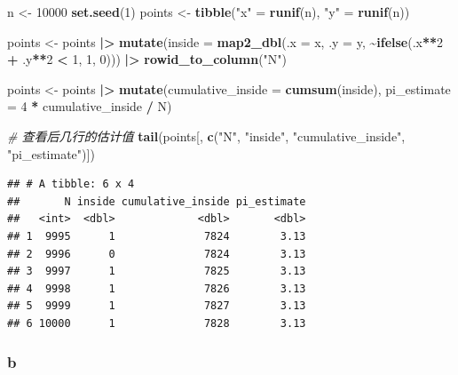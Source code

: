 \documentclass[
]{article}
\newenvironment{Shaded}{\begin{snugshade}}{\end{snugshade}}
\newcommand{\AttributeTok}[1]{\textcolor[rgb]{0.13,0.29,0.53}{#1}}
\newcommand{\CommentTok}[1]{\textcolor[rgb]{0.56,0.35,0.01}{\textit{#1}}}
\newcommand{\DecValTok}[1]{\textcolor[rgb]{0.00,0.00,0.81}{#1}}
\newcommand{\FunctionTok}[1]{\textcolor[rgb]{0.13,0.29,0.53}{\textbf{#1}}}
\newcommand{\NormalTok}[1]{#1}
\newcommand{\OtherTok}[1]{\textcolor[rgb]{0.56,0.35,0.01}{#1}}
\newcommand{\SpecialCharTok}[1]{\textcolor[rgb]{0.81,0.36,0.00}{\textbf{#1}}}
\newcommand{\StringTok}[1]{\textcolor[rgb]{0.31,0.60,0.02}{#1}}
\begin{document}
\begin{Shaded}
\begin{Highlighting}[]
\NormalTok{n }\OtherTok{\textless{}{-}} \DecValTok{10000}
\FunctionTok{set.seed}\NormalTok{(}\DecValTok{1}\NormalTok{)}
\NormalTok{points }\OtherTok{\textless{}{-}} \FunctionTok{tibble}\NormalTok{(}\StringTok{"x"} \OtherTok{=} \FunctionTok{runif}\NormalTok{(n), }\StringTok{"y"} \OtherTok{=} \FunctionTok{runif}\NormalTok{(n))}

\NormalTok{points }\OtherTok{\textless{}{-}}\NormalTok{ points }\SpecialCharTok{|\textgreater{}}
\FunctionTok{mutate}\NormalTok{(}\AttributeTok{inside =} \FunctionTok{map2\_dbl}\NormalTok{(}\AttributeTok{.x =}\NormalTok{ x, }\AttributeTok{.y =}\NormalTok{ y, }\SpecialCharTok{\textasciitilde{}}\FunctionTok{ifelse}\NormalTok{(.x}\SpecialCharTok{**}\DecValTok{2} \SpecialCharTok{+}\NormalTok{ .y}\SpecialCharTok{**}\DecValTok{2} \SpecialCharTok{\textless{}} \DecValTok{1}\NormalTok{, }\DecValTok{1}\NormalTok{, }\DecValTok{0}\NormalTok{))) }\SpecialCharTok{|\textgreater{}}
\FunctionTok{rowid\_to\_column}\NormalTok{(}\StringTok{"N"}\NormalTok{)}


\NormalTok{points }\OtherTok{\textless{}{-}}\NormalTok{ points }\SpecialCharTok{|\textgreater{}}
  \FunctionTok{mutate}\NormalTok{(}\AttributeTok{cumulative\_inside =} \FunctionTok{cumsum}\NormalTok{(inside),}
         \AttributeTok{pi\_estimate =} \DecValTok{4} \SpecialCharTok{*}\NormalTok{ cumulative\_inside }\SpecialCharTok{/}\NormalTok{ N)}

\CommentTok{\# 查看后几行的估计值}
\FunctionTok{tail}\NormalTok{(points[, }\FunctionTok{c}\NormalTok{(}\StringTok{"N"}\NormalTok{, }\StringTok{"inside"}\NormalTok{, }\StringTok{"cumulative\_inside"}\NormalTok{, }\StringTok{"pi\_estimate"}\NormalTok{)])}
\end{Highlighting}
\end{Shaded}

\begin{verbatim}
## # A tibble: 6 x 4
##       N inside cumulative_inside pi_estimate
##   <int>  <dbl>             <dbl>       <dbl>
## 1  9995      1              7824        3.13
## 2  9996      0              7824        3.13
## 3  9997      1              7825        3.13
## 4  9998      1              7826        3.13
## 5  9999      1              7827        3.13
## 6 10000      1              7828        3.13
\end{verbatim}

\subsubsection{b}\label{b-3}
\end{document}
